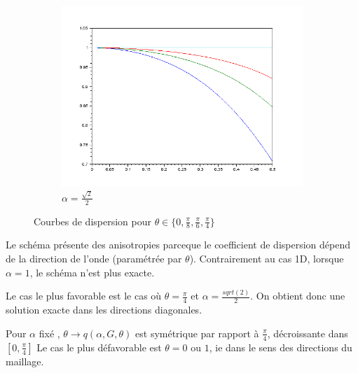 \documentclass{article}
\begin{document}
\begin{figure}
\begin{subfigure}[b]{0.3\textwidth}
								\includegraphics[scale=0.3]{img/graphe2-c.png}
                \caption{$\alpha = \frac{\sqrt 2}{2}$}
        \end{subfigure}
				\caption{Courbes de dispersion pour $\theta \in \{0, \frac{\pi}{8},  \frac{\pi}{6}, \frac{\pi}{4}\}$ }

\end{figure}


Le schéma présente des anisotropies parceque le coefficient de dispersion dépend de la direction de l'onde (paramétrée par $\theta$).
Contrairement au cas 1D, lorsque $\alpha = 1$, le schéma n'est plus exacte.

Le cas le plus favorable est le cas où $\theta = \frac{\pi}{4}$ et $\alpha = \frac{sqrt(2)}{2}$.  On obtient donc une solution exacte dans les directions diagonales.

Pour $\alpha$ fixé , $\theta \to q(\alpha, G, \theta)$ est symétrique par rapport à $\frac{\pi}{4}$, décroissante dans $[0, \frac{\pi}{4}]$
Le cas le plus défavorable est $\theta = 0$ ou $1$, ie dans le sens des directions du maillage.
\end{document}
